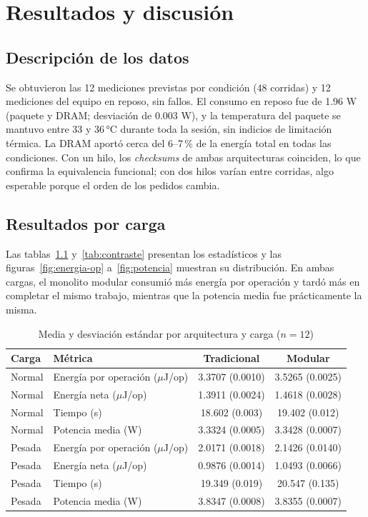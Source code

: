 \chapter{Resultados y discusión}
\label{cap:resultados}

\section{Descripción de los datos}

Se obtuvieron las 12 mediciones previstas por condición (48 corridas) y 12 mediciones del equipo en reposo, sin fallos. El consumo en reposo fue de 1.96 W (paquete y DRAM; desviación de 0.003 W), y la temperatura del paquete se mantuvo entre 33 y 36\,°C durante toda la sesión, sin indicios de limitación térmica. La DRAM aportó cerca del 6--7\,\% de la energía total en todas las condiciones. Con un hilo, los \textit{checksums} de ambas arquitecturas coinciden, lo que confirma la equivalencia funcional; con dos hilos varían entre corridas, algo esperable porque el orden de los pedidos cambia.

\section{Resultados por carga}

Las tablas~\ref{tab:medias} y~\ref{tab:contraste} presentan los estadísticos y las figuras~\ref{fig:energia-op} a~\ref{fig:potencia} muestran su distribución. En ambas cargas, el monolito modular consumió más energía por operación y tardó más en completar el mismo trabajo, mientras que la potencia media fue prácticamente la misma.

\begin{table}[htbp]
\centering
\caption{Media y desviación estándar por arquitectura y carga ($n = 12$)}
\label{tab:medias}
\small
{}
\setlength{\parskip}{0pt}
\begin{tabular}{@{}llcc@{}}
\toprule
\textbf{Carga} & \textbf{Métrica} & \textbf{Tradicional} & \textbf{Modular} \\
\midrule
Normal & Energía por operación ($\mu$J/op) & 3.3707 (0.0010) & 3.5265 (0.0025) \\
Normal & Energía neta ($\mu$J/op) & 1.3911 (0.0024) & 1.4618 (0.0028) \\
Normal & Tiempo (s) & 18.602 (0.003) & 19.402 (0.012) \\
Normal & Potencia media (W) & 3.3324 (0.0005) & 3.3428 (0.0007) \\
\addlinespace
Pesada & Energía por operación ($\mu$J/op) & 2.0171 (0.0018) & 2.1426 (0.0140) \\
Pesada & Energía neta ($\mu$J/op) & 0.9876 (0.0014) & 1.0493 (0.0066) \\
Pesada & Tiempo (s) & 19.349 (0.019) & 20.547 (0.135) \\
Pesada & Potencia media (W) & 3.8347 (0.0008) & 3.8355 (0.0007) \\
\bottomrule
\end{tabular}
\end{table}

